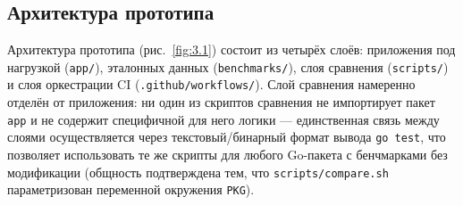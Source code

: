 \subsection{Архитектура прототипа}
\label{sec:3.2}

Архитектура прототипа (рис.~\ref{fig:3.1}) состоит из четырёх слоёв:
приложения под нагрузкой (\texttt{app/\allowbreak }), эталонных данных
(\texttt{benchmarks/\allowbreak }), слоя сравнения (\texttt{scripts/\allowbreak }) и слоя оркестрации
CI (\texttt{.github/\allowbreak workflows/\allowbreak }). Слой сравнения намеренно отделён от
приложения: ни один из скриптов сравнения не импортирует пакет
\texttt{app} и не содержит специфичной для него логики — единственная связь
между слоями осуществляется через текстовый/бинарный формат вывода
\texttt{go test}, что позволяет использовать те же скрипты для любого
Go-пакета с бенчмарками без модификации (общность подтверждена тем, что
\texttt{scripts/\allowbreak compare.sh} параметризован переменной окружения
\texttt{PKG}).

